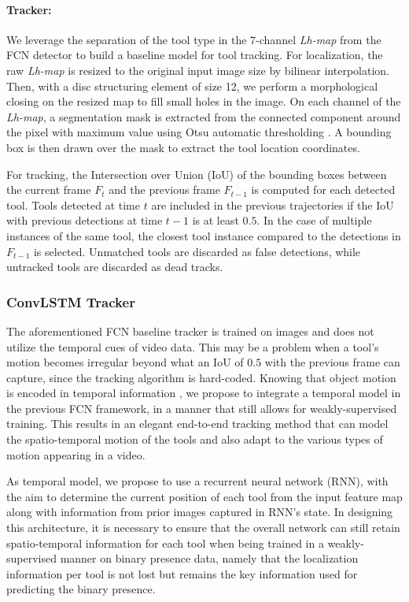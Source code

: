 \documentclass{svjour3}                     \smartqed
\newcommand{\bd}[1]{\textbf{#1}}
\begin{document}
\paragraph{\bd{Tracker: }}
We leverage the separation of the tool type in the $7$-channel \emph{Lh-map} from the FCN detector to build a baseline model for tool tracking.
For localization, the raw \emph{Lh-map} is resized to the original input image size by bilinear interpolation. 
Then, with a disc structuring element of size 12, we perform a morphological closing on the resized map to fill small holes in the image.
On each channel of the \emph{Lh-map}, a segmentation mask is extracted from the connected component around the pixel with maximum value using Otsu automatic thresholding \cite{smc:otsu1979threshold}. A bounding box is then drawn over the mask to extract the tool location coordinates.

For tracking, the Intersection over Union (IoU) of the bounding boxes between the current frame $F_t$ and the previous frame $F_{t-1}$ is computed for each detected tool. Tools detected at time $t$ are included in the previous trajectories if the IoU with previous detections at time $t-1$ is at least $0.5$.
In the case of multiple instances of the same tool, the closest tool instance compared to the detections in $F_{t-1}$ is selected.
Unmatched tools are discarded as false detections, while untracked tools are discarded as dead tracks.



\subsubsection{ConvLSTM Tracker}\label{sec:convlstm_tracker}
The aforementioned FCN baseline tracker is trained on images and does not utilize the temporal cues of video data.
This may be a problem when a tool's motion becomes irregular beyond what an IoU of $0.5$ with the previous frame can capture, since the tracking algorithm is hard-coded. 
Knowing that object motion is encoded in temporal information \cite{cvpr:luo2018fast,arXiv:liu2017mobile}, we propose to integrate a temporal model in the previous FCN framework, in a manner that still allows for weakly-supervised training. This results in an elegant end-to-end tracking method that can model the spatio-temporal motion of the tools and also adapt to the various types of motion appearing in a video. 

As temporal model, we propose to use a recurrent neural network (RNN), with the aim to determine the current position of each tool from the input feature map along with information from prior images captured in RNN's state. In designing this architecture, it is necessary to ensure that the overall network can still retain spatio-temporal information for each tool when being trained in a weakly-supervised manner on binary presence data, namely that the localization information per tool is not lost but remains the key information used for predicting the binary presence.
\end{document}
